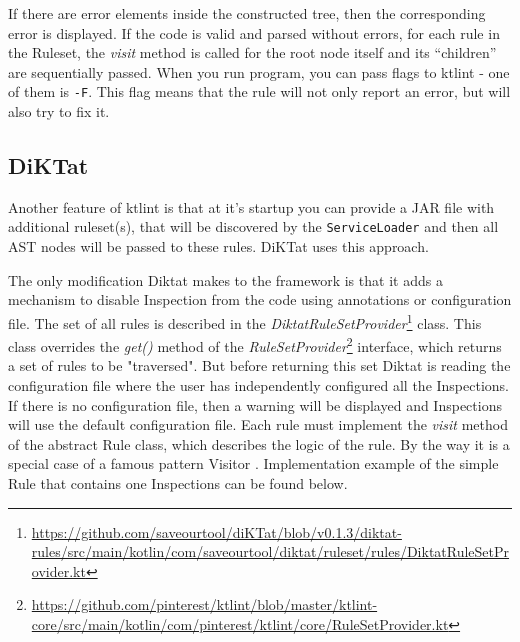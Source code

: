 If there are error elements inside the constructed tree, then the corresponding error is displayed. If the code is valid and parsed without errors, for each rule in the Ruleset, the \textsl{visit} method is called for the root node itself and its “children” are sequentially passed.
When you run program, you can pass flags to ktlint - one of them is \texttt{-F}. This flag means that the rule will not only report an error, but will also try to fix it.

\subsection{DiKTat}

Another feature of ktlint is that at it's startup you can provide a JAR file with additional ruleset(s), that will be discovered by the \texttt{ServiceLoader} and then all AST nodes will be passed to these rules. DiKTat uses this approach.

The only modification Diktat makes to the framework is that it adds a mechanism to disable Inspection from the code using annotations or configuration file. The set of all rules is described in the \textsl{DiktatRuleSetProvider}\footnote{\url{https://github.com/saveourtool/diKTat/blob/v0.1.3/diktat-rules/src/main/kotlin/com/saveourtool/diktat/ruleset/rules/DiktatRuleSetProvider.kt}} class. This class overrides the \textsl{get()} method of the \textsl{RuleSetProvider}\footnote{\url{https://github.com/pinterest/ktlint/blob/master/ktlint-core/src/main/kotlin/com/pinterest/ktlint/core/RuleSetProvider.kt}} interface, which returns a set of rules to be "traversed". But before returning this set Diktat is reading the configuration file where the user has independently configured all the Inspections. If there is no configuration file, then a warning will be displayed and Inspections will use the default configuration file.
Each rule must implement the \textsl{visit} method of the abstract Rule class, which describes the logic of the rule. By the way it is a special case of a famous pattern Visitor \cite{ref:gang}. Implementation example of the simple Rule that contains one Inspections can be found below.

